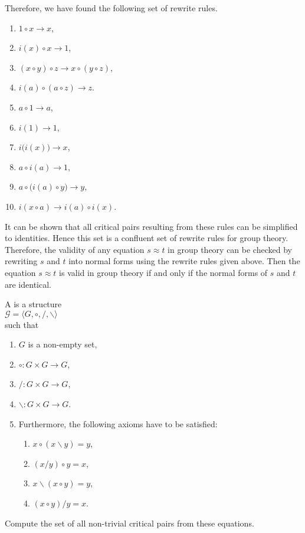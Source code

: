 Therefore, we have found the following set of rewrite rules.
\begin{enumerate}
\item $1 \circ x \rightarrow x$,
\item $i(x) \circ x \rightarrow 1$, 
\item $(x \circ y) \circ z \rightarrow x \circ (y \circ z)$,
\item $i(a) \circ (a \circ z) \rightarrow z$.
\item $a \circ 1 \rightarrow a$,
\item $i(1) \rightarrow 1$,
\item $i\bigl(i(x)\bigr) \rightarrow x$,
\item $a \circ i(a) \rightarrow 1$,
\item $a \circ \bigl(i(a) \circ y\bigr) \rightarrow y$,
\item $i(x \circ a) \rightarrow i(a) \circ i(x)$.
\end{enumerate}
It can be shown that all critical pairs resulting from these rules can be simplified to identities.  Hence this
set is a confluent set of rewrite rules for group theory.  Therefore, the validity of any equation $s \approx t$
in group theory can be checked by rewriting $s$ and $t$ into normal forms using the rewrite rules given  
above.  Then the equation $s \approx t$ is valid in group theory if and only if the normal forms of $s$ and $t$
are identical. 
\eoxs

\exercise
A  is a structure
\\[0.2cm]
\hspace*{1.3cm}
$ \mathcal{G} = \langle G, \circ, /, \backslash \rangle$
\\[0.2cm]
such that
\begin{enumerate}
\item $G$ is a non-empty set,
\item $\circ: G \times G \rightarrow G$,
\item $/: G \times G \rightarrow G$,
\item $\backslash: G \times G \rightarrow G$.
\item Furthermore, the following axioms have to be satisfied:
      \begin{enumerate}
      \item $x \circ (x \backslash y) = y$,
      \item $(x / y) \circ y = x$,
      \item $x \backslash (x \circ y) = y$,
      \item $(x \circ y) /y = x$.
      \end{enumerate}  
\end{enumerate}
Compute the set of all non-trivial critical pairs from these equations.

